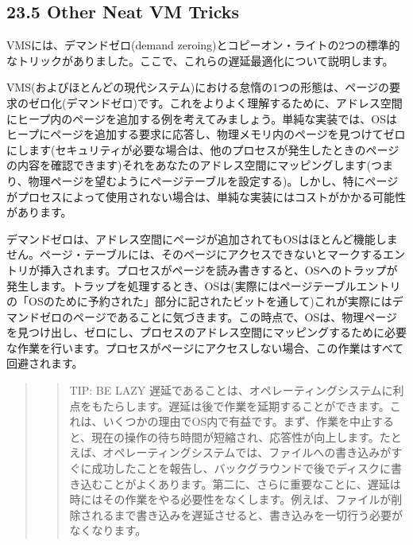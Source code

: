\hypertarget{other-neat-vm-tricks}{%
\subsection*{23.5 Other Neat VM Tricks}\label{other-neat-vm-tricks}}

VMSには、デマンドゼロ(demand
zeroing)とコピーオン・ライトの2つの標準的なトリックがありました。ここで、これらの遅延最適化について説明します。

VMS(およびほとんどの現代システム)における怠惰の1つの形態は、ページの要求のゼロ化(デマンドゼロ)です。これをよりよく理解するために、アドレス空間にヒープ内のページを追加する例を考えてみましょう。単純な実装では、OSはヒープにページを追加する要求に応答し、物理メモリ内のページを見つけてゼロにします(セキュリティが必要な場合は、他のプロセスが発生したときのページの内容を確認できます)それをあなたのアドレス空間にマッピングします(つまり、物理ページを望むようにページテーブルを設定する)。しかし、特にページがプロセスによって使用されない場合は、単純な実装にはコストがかかる可能性があります。

デマンドゼロは、アドレス空間にページが追加されてもOSはほとんど機能しません。ページ・テーブルには、そのページにアクセスできないとマークするエントリが挿入されます。プロセスがページを読み書きすると、OSへのトラップが発生します。トラップを処理するとき、OSは(実際にはページテーブルエントリの「OSのために予約された」部分に記されたビットを通して)これが実際にはデマンドゼロのページであることに気づきます。この時点で、OSは、物理ページを見つけ出し、ゼロにし、プロセスのアドレス空間にマッピングするために必要な作業を行います。プロセスがページにアクセスしない場合、この作業はすべて回避されます。

\begin{quote}
\begin{quote}
TIP: BE LAZY
遅延であることは、オペレーティングシステムに利点をもたらします。遅延は後で作業を延期することができます。これは、いくつかの理由でOS内で有益です。まず、作業を中止すると、現在の操作の待ち時間が短縮され、応答性が向上します。たとえば、オペレーティングシステムでは、ファイルへの書き込みがすぐに成功したことを報告し、バックグラウンドで後でディスクに書き込むことがよくあります。第二に、さらに重要なことに、遅延は時にはその作業をやる必要性をなくします。例えば、ファイルが削除されるまで書き込みを遅延させると、書き込みを一切行う必要がなくなります。
\end{quote}
\end{quote}

